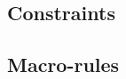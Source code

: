 \documentclass{llncs}
\newcommand\tsl[1]{\hbox{\ensuremath{\mathsl{#1}}}}
\newcommand{\mr}[3]{\tsl{mr}(#1,#2,#3)}
\newcommand{\Oscr}{\mathcal{O}}
\newcommand{\Cscr}{\mathcal{C}}
\newcommand{\Sscr}{\mathcal{S}}
\newcommand{\Tscr}{\mathcal{T}}
\begin{document}
\subsection{Constraints}
\label{sec:constraints}



\subsection{Macro-rules}
\label{sec:macro_def}



\begin{comment}
Then, the set of macro-rules,
$\mr{F}{\Cscr}{\Oscr}{\Tscr}{\Sscr}$, that can introduce a formula, $F$,
given a root side-formula context $\Sscr$, is represented by a list of
closed leaves
$\Cscr$, a list of open leaves $\Oscr$, and a set of sets of constraints,
$\Tscr$.
\end{comment}
\end{document}
